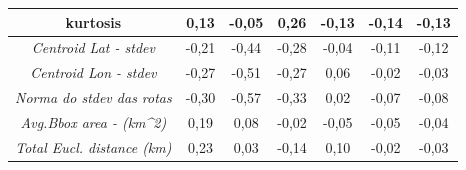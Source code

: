 \begin{spacing}{1}
\begin{table}[htb]
{\begin{tabular}{|c|ccc|ccc|}
    kurtosis & \cellcolor[HTML]{DB775E}0,13 & \cellcolor[HTML]{F16C62}-0,05 & \cellcolor[HTML]{B88956}0,26 & \cellcolor[HTML]{DD765E}-0,13 & \cellcolor[HTML]{DD775D}-0,14 & \cellcolor[HTML]{DD765D}-0,13 \\ \hline
    \textit{Centroid Lat - stdev} & \cellcolor[HTML]{CB805A}-0,21 & \cellcolor[HTML]{919D4D}-0,44 & \cellcolor[HTML]{B98856}-0,28 & \cellcolor[HTML]{F56A63}-0,04 & \cellcolor[HTML]{E3735F}-0,11 & \cellcolor[HTML]{E2745E}-0,12 \\
    \textit{Centroid Lon - stdev} & \cellcolor[HTML]{BC8757}-0,27 & \cellcolor[HTML]{7FA64A}-0,51 & \cellcolor[HTML]{BB8856}-0,27 & \cellcolor[HTML]{EF6D62}0,06 & \cellcolor[HTML]{F96863}-0,02 & \cellcolor[HTML]{F86963}-0,03 \\
    \textit{Norma do stdev das rotas} & \cellcolor[HTML]{B58B55}-0,30 & \cellcolor[HTML]{70AD47}-0,57 & \cellcolor[HTML]{AD8F53}-0,33 & \cellcolor[HTML]{FB6765}0,02 & \cellcolor[HTML]{ED6F61}-0,07 & \cellcolor[HTML]{EB6F60}-0,08 \\
    \textit{Avg.Bbox area - (km\textasciicircum{}2)} & \cellcolor[HTML]{CB7F5A}0,19 & \cellcolor[HTML]{E97061}0,08 & \cellcolor[HTML]{FA6864}-0,02 & \cellcolor[HTML]{F26C62}-0,05 & \cellcolor[HTML]{F36B62}-0,05 & \cellcolor[HTML]{F36B62}-0,04 \\
    \textit{Total Eucl. distance (km)} & \cellcolor[HTML]{C08558}0,23 & \cellcolor[HTML]{F66964}0,03 & \cellcolor[HTML]{DC775D}-0,14 & \cellcolor[HTML]{E47260}0,10 & \cellcolor[HTML]{F96863}-0,02 & \cellcolor[HTML]{F76963}-0,03 \\

\end{tabular}}
\end{table}
\end{spacing}
